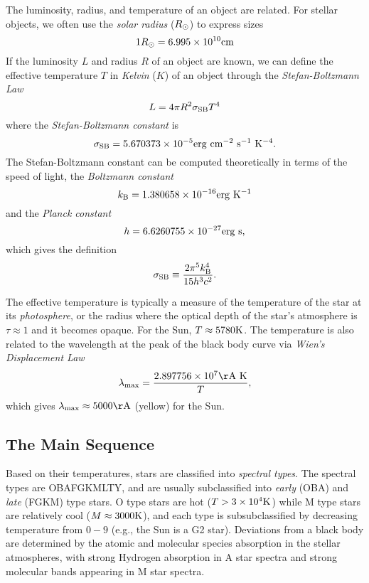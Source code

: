 \documentclass[12pt]{article}
\begin{document}
The luminosity, radius, and temperature of an object are related. For stellar
objects, we often use the {\it solar radius} ($R_{\odot}$) to express sizes
\begin{equation}
1R_{\odot} = 6.995 \times 10^{10} \mathrm{cm}
\end{equation}
\noindent
If the luminosity $L$ and radius $R$ of an object are known, we can define
the effective temperature $T$ in {\it Kelvin} ($K$)
of an object through the {\it Stefan-Boltzmann Law}
\begin{equation}
L = 4\pi R^{2}\sigma_{\mathrm{SB}} T^{4}
\end{equation}
\noindent
where the {\it Stefan-Boltzmann constant} is
\begin{equation}
\sigma_{\mathrm{SB}} = 5.670373\times10^{-5} \mathrm{erg}~\mathrm{cm}^{-2}~\mathrm{s}^{-1}~\mathrm{K}^{-4}.
\end{equation}
The Stefan-Boltzmann constant can be computed theoretically in
terms of the speed of light, the {\it Boltzmann constant}
\begin{equation}
k_{\mathrm{B}} = 1.380658\times10^{-16} \mathrm{erg}~\mathrm{K}^{-1}
\end{equation}
\noindent
and the {\it Planck constant}
\begin{equation}
h = 6.6260755\times10^{-27}\mathrm{erg}~\mathrm{s},
\end{equation}
\noindent
which gives the definition
\begin{equation}
\sigma_{\mathrm{SB}} \equiv \frac{2\pi^5 k_{\mathrm{B}}^4}{15 h^3 c^2}.
\end{equation}

The effective temperature is typically a measure of the temperature
of the star at its {\it photosphere}, or the radius where the optical
depth of the star's atmosphere is $\tau\approx1$ and it becomes opaque. 
For the Sun,
$T\approx5780\mathrm{K}$. The temperature is also related to the wavelength
at the peak of the black body curve via {\it Wien's Displacement Law}
\begin{equation}
\lambda_{\mathrm{max}} = \frac{2.897756\times10^{7} \Ang~\K}{T},
\end{equation}
which gives $\lambda_{\mathrm{max}}\approx5000\Ang$ (yellow)
for the Sun.

\subsection{The Main Sequence}

Based on their temperatures, stars are classified into {\it spectral types}.
The spectral types are OBAFGKMLTY, and are usually subclassified into {\it early}
(OBA) and {\it late} (FGKM) type stars. O type stars are hot ($T>3\times10^4\mathrm{K}$) while
M type stars are relatively cool ($M\approx3000\mathrm{K}$), and each type is
subsubclassified by decreasing temperature
from $0-9$ (e.g., the Sun is a G2 star). Deviations from a black body are
determined by the atomic and molecular species absorption in the stellar atmospheres,
with strong Hydrogen absorption in A star spectra and strong molecular bands appearing
in M star spectra.
\end{document}
